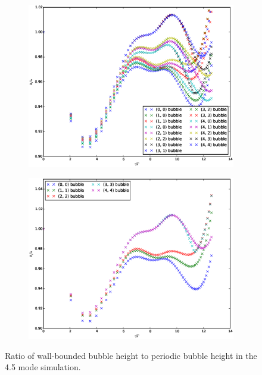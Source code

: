 \begin{figure}
\begin{subfigure}[b]{\columnwidth}
  \includegraphics[width=\columnwidth]{plts/walls_h}
\end{subfigure}
\begin{subfigure}[b]{\columnwidth}
  \includegraphics[width=\columnwidth]{plts/walls_h_diag}
\end{subfigure}
\caption{ 
Ratio of wall-bounded bubble height to periodic bubble height in the 4.5 mode simulation.
}
\end{figure}


